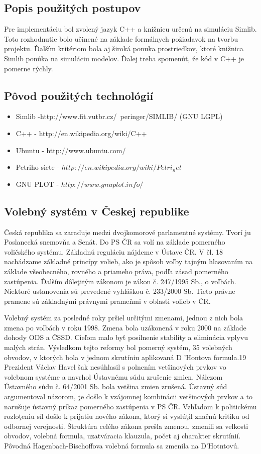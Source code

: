 \documentclass[12pt,a4paper,titlepage,final]{article}
\begin{document}
\subsection{Popis použitých postupov}
Pre implementáciu bol zvolený jazyk C++ a knižnicu určenú na simuláciu Simlib. Toto rozhodnutie bolo učinené na základe formálnych požiadavok na tvorbu projektu. Ďalším kritériom bola aj široká ponuka prostriedkov, ktoré knižnica Simlib ponúka na simuláciu modelov. Ďalej treba spomenúť, že kód v C++ je pomerne rýchly.



\subsection{Pôvod použitých technológií}
\begin{itemize}
\item Simlib -http://www.fit.vutbr.cz/~peringer/SIMLIB/ (GNU LGPL)
\item C++ - http://en.wikipedia.org/wiki/C++
\item Ubuntu - http://www.ubuntu.com/
\item Petriho siete - $http://en.wikipedia.org/wiki/Petri_net$
\item GNU PLOT - $http://www.gnuplot.info/$

\end{itemize}
\subsection{Volebný systém v Českej republike}
Česká republika sa zaraďuje medzi dvojkomorové parlamentné 
systémy. Tvorí ju Poslanecká snemovňa a Senát. Do PS ČR sa volí na 
základe pomerného voličského systému. Základnú reguláciu nájdeme 
v Ústave ČR. V čl. 18 nachádzame základné princípy volieb, ako je spôsob 
voľby tajným hlasovaním na základe všeobecného, rovného a priameho 
práva, podľa zásad pomerného zastúpenia. Ďalším dôleţitým zákonom je 
zákon č. 247/1995 Sb., o voľbách. Niektoré ustanovenia sú prevedené 
vyhláškou č. 233/2000 Sb. Tieto právne pramene sú základnými právnymi 
prameňmi v oblasti volieb v ČR. 
 
Volebný systém za posledné roky pršiel určitými zmenami, jednou 
z nich bola zmena po voľbách v roku 1998. Zmena bola uzákonená v roku 
2000 na základe dohody ODS a ČSSD. Cieľom malo byť posilnenie 
stability a eliminácia vplyvu malých strán. Výsledkom tejto reformy bol 
pomerný systém, 35 volebných obvodov, v ktorých bola v jednom skrutíniu 
aplikovaná D 'Hontova formula.19
 Prezident Václav Havel šak nesúhlasil 
s polnením vetšinových prvkov vo volebnom systéme a navrhol Ústavnému 
súdu zrušenie zmien. Nálezom Ústavného súdu č. 64/2001 Sb. bola vetšina 
zmien zrušená. Ústavný súd argumentoval názorom, ţe došlo k vzájomnej 
kombinácii vetšinových prvkov a to narušuje ústavný príkaz pomerného 
zastúpenia v PS ČR. Vzhľadom k politickému rozloţeniu síl došlo k prijatiu 
nového zákona, ktorý si vyslúţil značnú kritiku od odbornej verejnosti. 
Štruktúra celého zákona prešla zmenou, zmenili sa velkosti obvodov, 
volebná formula, uzatváracia klauzula, počet aj charakter skrutínií. Pôvodná 
Hagenbach-Bischoffova volebná formula sa zmenila na D'Hotntovú. 
 
\end{document}
